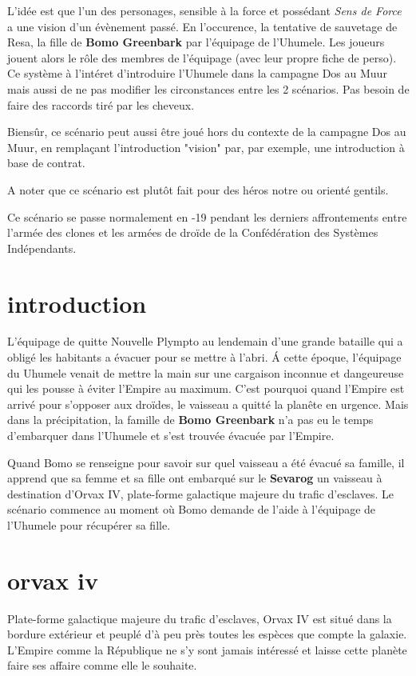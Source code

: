 \documentclass{jdrp}
\begin{document}
	L’idée est que l’un des personages, sensible à la force et possédant \textit{Sens de Force} a une vision d’un évènement passé. En l’occurence, la tentative de sauvetage de Resa, la fille de \textbf{Bomo Greenbark} par l'équipage de l’Uhumele. Les joueurs jouent alors le rôle des membres de l’équipage (avec leur propre fiche de perso). Ce système à l’intéret d’introduire l’Uhumele dans la campagne Dos au Muur mais aussi de ne pas modifier les circonstances entre les 2 scénarios. Pas besoin de faire des raccords tiré par les cheveux.

	Biensûr, ce scénario peut aussi être joué hors du contexte de la campagne Dos au Muur, en remplaçant l’introduction "vision" par, par exemple, une introduction à base de contrat.

	A noter que ce scénario est plutôt fait pour des héros notre ou orienté gentils. 

	Ce scénario se passe normalement en -19 pendant les derniers affrontements entre l’armée des clones et les armées de droïde de la Confédération des Systèmes Indépendants.

	\twocolumn

	\section{introduction}
	L’équipage de  quitte Nouvelle Plympto au lendemain d’une grande bataille qui a obligé les habitants a évacuer pour se mettre à l’abri. \'A cette époque, l’équipage du Uhumele venait de mettre la main sur une cargaison inconnue et dangeureuse qui les pousse à éviter l’Empire au maximum. C’est pourquoi quand l’Empire est arrivé pour s’opposer aux droïdes, le vaisseau a quitté la planête en urgence. Mais dans la précipitation, la famille de \textbf{Bomo Greenbark} n’a pas eu le temps d’embarquer dans l’Uhumele et s'est trouvée évacuée par l’Empire. 

	Quand Bomo se renseigne pour savoir sur quel vaisseau a été évacué sa famille, il apprend que sa femme et sa fille ont embarqué sur le \textbf{Sevarog} un vaisseau à destination d’Orvax IV, plate-forme galactique majeure du trafic d’esclaves. Le scénario commence au moment où Bomo demande de l’aide à l’équipage de l’Uhumele pour récupérer sa fille.

	\section{orvax iv}
	Plate-forme galactique majeure du trafic d’esclaves, Orvax IV est situé dans la bordure extérieur et peuplé d’à peu près toutes les espèces que compte la galaxie. L’Empire comme la République ne s’y sont jamais intéressé et laisse cette planète faire ses affaire comme elle le souhaite.
\end{document}
